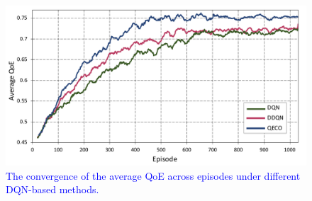 \documentclass[10pt, journal,letterpaper]{IEEEtran}
\begin{document}
\begin{figure}
	\captionsetup{name=Fig.}
	\centering
	\includegraphics[width=0.91\linewidth]{m1}
	\vspace*{-3mm}
	\caption{\textcolor{blue}{The convergence of the average QoE across episodes under different DQN-based methods.
	}}
	\vspace*{-3mm}
	\label{chart01}
\end{figure}



\vspace{-5mm}
\end{document}
